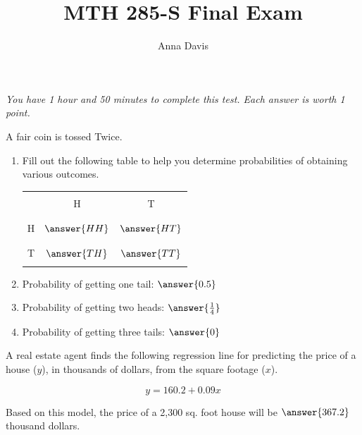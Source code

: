 \documentclass{ximera}
\author{Anna Davis} \title{MTH 285-S Final Exam}
\begin{document}
\begin{abstract}

\end{abstract}
\maketitle
 \textit{You have 1 hour and 50 minutes to complete this test.  Each answer is worth 1 point.}
\begin{problem}\label{prob:140finalprob1}
A fair coin is tossed Twice.  
\begin{enumerate}
    \item Fill out the following table to help you determine probabilities of obtaining various outcomes.
    
\begin{center}
\begin{tabular}{|c|c|c|}
 \hline
 &&   \\
 & H& T  \\
 &&   \\
  \hline
  &&\\
 H&$\answer{HH}$&$\answer{HT}$ \\
  && \\
 \hline
  &&\\
 T&$\answer{TH}$&$\answer{TT}$ \\
  && \\
 \hline
 \end{tabular}
\end{center}    
\item Probability of getting one tail: $\answer{0.5}$

\item Probability of getting two heads: $\answer{\frac{1}{4}}$
\item Probability of getting three tails: $\answer{0}$
\end{enumerate}
\end{problem}

\begin{problem}\label{prob:140finalprob2}
A real estate agent finds the following regression line for predicting the price of a house ($y$), in thousands of dollars, from the square footage ($x$).

$$y = 160.2 + 0.09x$$

Based on this model, the price of a 2,300 sq. foot house will be $\answer{367.2}$ thousand dollars.
\end{problem}
\end{document}
